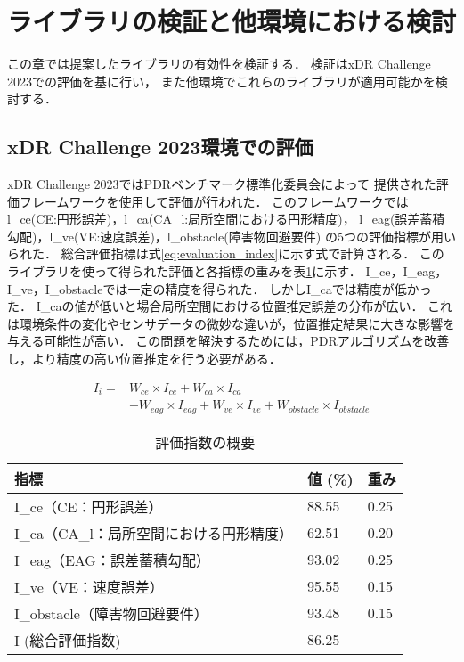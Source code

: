 
\section{ライブラリの検証と他環境における検討}
この章では提案したライブラリの有効性を検証する．
検証はxDR Challenge 2023での評価を基に行い，
また他環境でこれらのライブラリが適用可能かを検討する．

\subsection{xDR Challenge 2023環境での評価}
xDR Challenge 2023ではPDRベンチマーク標準化委員会によって
提供された評価フレームワークを使用して評価が行われた．
このフレームワークではl\_ce(CE:円形誤差)，l\_ca(CA\_l:局所空間における円形精度)，
l\_eag(誤差蓄積勾配)，l\_ve(VE:速度誤差)，l\_obstacle(障害物回避要件)
の5つの評価指標が用いられた．
総合評価指標は式\ref{eq:evaluation_index}に示す式で計算される．
このライブラリを使って得られた評価と各指標の重みを表\ref{table:evaluation_index}に示す．
I\_ce，I\_eag， I\_ve，I\_obstacleでは一定の精度を得られた．
しかしI\_caでは精度が低かった．
I\_caの値が低いと場合局所空間における位置推定誤差の分布が広い．
これは環境条件の変化やセンサデータの微妙な違いが，位置推定結果に大きな影響を与える可能性が高い．
この問題を解決するためには，PDRアルゴリズムを改善し，より精度の高い位置推定を行う必要がある．

\begin{equation}
	\begin{aligned}
		I_i = & W_{ce} \times I_{ce} + W_{ca} \times I_{ca}                                        \\
		      & + W_{eag} \times I_{eag} + W_{ve} \times I_{ve} + W_{obstacle} \times I_{obstacle}
	\end{aligned}
	\label{eq:evaluation_index}
\end{equation}


\begin{table}[ht]
  \caption{評価指数の概要}
	\centering
	\begin{tabular}{l|l|l}
		\hline
		指標                        & 値 (\%) & 重み   \\ \hline
		I\_ce（CE：円形誤差）            & 88.55  & 0.25 \\
		I\_ca（CA\_l：局所空間における円形精度） & 62.51  & 0.20 \\
		I\_eag（EAG：誤差蓄積勾配）        & 93.02  & 0.25 \\
		I\_ve（VE：速度誤差）            & 95.55  & 0.15 \\
		I\_obstacle（障害物回避要件）      & 93.48  & 0.15 \\
		I (総合評価指数)                & 86.25  &      \\ \hline
	\end{tabular}
	\label{table:evaluation_index}
\end{table}


